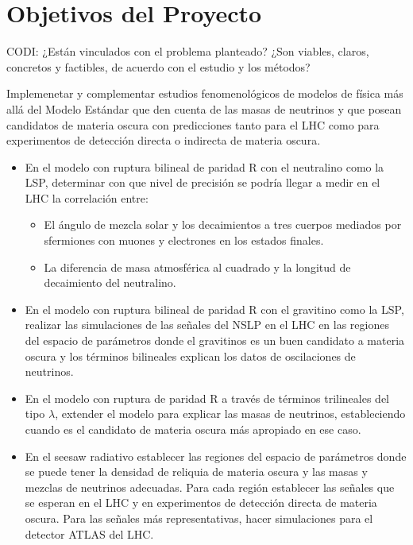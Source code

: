 \section{Objetivos del Proyecto }
\begin{instrucciones}
 CODI: ¿Están vinculados con el problema planteado? ¿Son viables, claros, concretos y factibles, de acuerdo con el estudio y los métodos?
\end{instrucciones}

Implemenetar y complementar estudios fenomenológicos de modelos de
física más allá del Modelo Estándar que den cuenta de las masas de neutrinos y que posean
candidatos de materia oscura con predicciones tanto para el LHC como
para experimentos de detección directa o indirecta de materia oscura.

\begin{itemize}
\item 
\begin{proyecto}
  En el modelo con ruptura bilineal de paridad R con el neutralino como la LSP, determinar con
  que nivel de precisión se podría llegar a medir en el LHC la correlación entre:
  \begin{itemize}
  \item El ángulo de mezcla solar y los decaimientos a tres cuerpos mediados
    por sfermiones con muones y electrones en los estados finales.
  \item La diferencia de masa atmosférica al cuadrado y la longitud de
    decaimiento del neutralino.
  \end{itemize}
\end{proyecto}

\item 
\begin{proyecto}
  En el modelo con ruptura bilineal de paridad R con el gravitino como
  la LSP, realizar las simulaciones de las señales del NSLP en el LHC
  en las regiones del espacio de parámetros donde el gravitinos es un
  buen candidato a materia oscura y los términos bilineales explican
  los datos de oscilaciones de neutrinos.
\end{proyecto}

\item 
\begin{proyecto}
  En el modelo con ruptura de paridad R a través de términos
  trilineales del tipo $\lambda$, extender el modelo para explicar las
  masas de neutrinos, estableciendo cuando es el candidato de materia
  oscura más apropiado en ese caso.
\end{proyecto}


\item 
\begin{proyecto}
  En el seesaw radiativo establecer las regiones del espacio de
  parámetros donde se puede tener la densidad de reliquia de materia
  oscura y las masas y mezclas de neutrinos adecuadas. Para cada
  región establecer las señales que se esperan en el LHC y en
  experimentos de detección directa de materia oscura.  Para las
  señales más representativas, hacer simulaciones para el detector
  ATLAS del LHC.
\end{proyecto}


\end{itemize}


